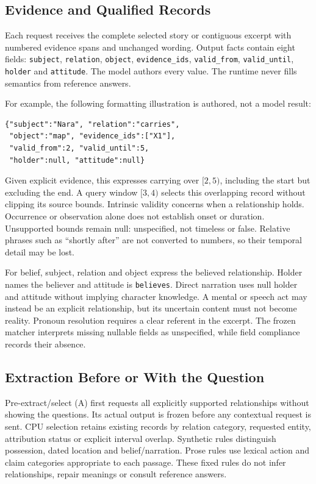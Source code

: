 \documentclass[a4paper,twoside]{article}
\begin{document}
\subsection{Evidence and Qualified Records}
\noindent Each request receives the complete selected story or contiguous excerpt with numbered evidence spans and unchanged wording. Output facts contain eight fields: \texttt{subject}, \texttt{relation}, \texttt{object}, \texttt{evidence\_ids}, \texttt{valid\_from}, \texttt{valid\_until}, \texttt{holder} and \texttt{attitude}. The model authors every value. The runtime never fills semantics from reference answers.

For example, the following formatting illustration is authored, not a model result:
\begin{small}\begin{verbatim}
{"subject":"Nara", "relation":"carries",
 "object":"map", "evidence_ids":["X1"],
 "valid_from":2, "valid_until":5,
 "holder":null, "attitude":null}
\end{verbatim}\end{small}
Given explicit evidence, this expresses carrying over $[2,5)$, including the start but excluding the end. A query window $[3,4)$ selects this overlapping record without clipping its source bounds. Intrinsic validity concerns when a relationship holds. Occurrence or observation alone does not establish onset or duration. Unsupported bounds remain null: unspecified, not timeless or false. Relative phrases such as ``shortly after'' are not converted to numbers, so their temporal detail may be lost.

For belief, subject, relation and object express the believed relationship. Holder names the believer and attitude is \texttt{believes}. Direct narration uses null holder and attitude without implying character knowledge. A mental or speech act may instead be an explicit relationship, but its uncertain content must not become reality. Pronoun resolution requires a clear referent in the excerpt. The frozen matcher interprets missing nullable fields as unspecified, while field compliance records their absence.

\subsection{Extraction Before or With the Question}
\noindent Pre-extract/select (A) first requests all explicitly supported relationships without showing the questions. Its actual output is frozen before any contextual request is sent. CPU selection retains existing records by relation category, requested entity, attribution status or explicit interval overlap. Synthetic rules distinguish possession, dated location and belief/narration. Prose rules use lexical action and claim categories appropriate to each passage. These fixed rules do not infer relationships, repair meanings or consult reference answers.
\end{document}
